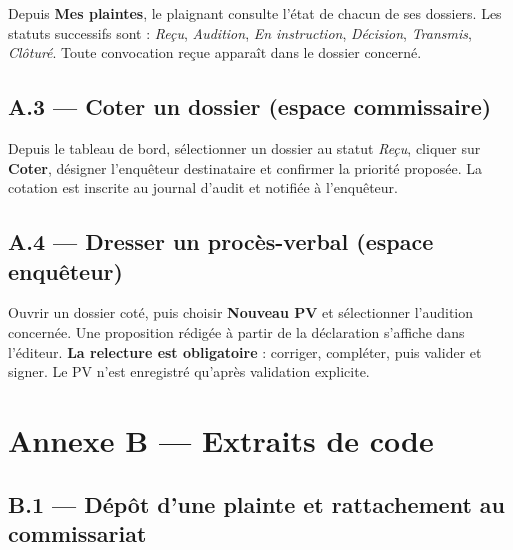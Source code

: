 Depuis \textbf{Mes plaintes}, le plaignant consulte l'état de chacun de ses dossiers. Les statuts successifs sont : \textit{Reçu}, \textit{Audition}, \textit{En instruction}, \textit{Décision}, \textit{Transmis}, \textit{Clôturé}. Toute convocation reçue apparaît dans le dossier concerné.


\subsection*{A.3 — Coter un dossier (espace commissaire)}

Depuis le tableau de bord, sélectionner un dossier au statut \textit{Reçu}, cliquer sur \textbf{Coter}, désigner l'enquêteur destinataire et confirmer la priorité proposée. La cotation est inscrite au journal d'audit et notifiée à l'enquêteur.


\subsection*{A.4 — Dresser un procès-verbal (espace enquêteur)}

Ouvrir un dossier coté, puis choisir \textbf{Nouveau PV} et sélectionner l'audition concernée. Une proposition rédigée à partir de la déclaration s'affiche dans l'éditeur. \textbf{La relecture est obligatoire} : corriger, compléter, puis valider et signer. Le PV n'est enregistré qu'après validation explicite.


\section*{Annexe B — Extraits de code}

\subsection*{B.1 — Dépôt d'une plainte et rattachement au commissariat}


